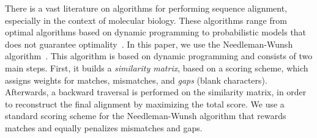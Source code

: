 
There is a vast literature on algorithms for performing sequence alignment,
especially in the context of molecular biology.
These algorithms range from optimal algorithms based on dynamic programming to
probabilistic models that does not guarantee
optimality~\cite{needleman70,smith81,carrillo88,hickey11}. 
In this paper, we use the Needleman-Wunsh algorithm~\cite{needleman70}.
This algorithm is based on dynamic programming and consists of two main steps.
First, it builds a \textit{similarity matrix}, based on a scoring scheme, which
assigns weights for matches, mismatches, and \textit{gaps} (blank characters).
Afterwards, a backward traversal is performed on the similarity matrix, in order
to reconstruct the final alignment by maximizing the total score.
We use a standard scoring scheme for the Needleman-Wunsh algorithm that rewards
matches and equally penalizes mismatches and gaps.



